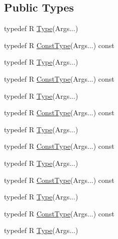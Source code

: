 \subsection*{Public Types}
\begin{DoxyCompactItemize}
\item 
typedef R \mbox{\hyperlink{structfakeit_1_1Prototype_3_01R_07Args_8_8_8_08_4_ab60f23ae5c02a3a715e1b7d959a1f502}{Type}}(Args...)
\item 
typedef R \mbox{\hyperlink{structfakeit_1_1Prototype_3_01R_07Args_8_8_8_08_4_ae3e717bc1f9c549d4517139ae932049e}{Const\+Type}}(Args...) const
\item 
typedef R \mbox{\hyperlink{structfakeit_1_1Prototype_3_01R_07Args_8_8_8_08_4_ab60f23ae5c02a3a715e1b7d959a1f502}{Type}}(Args...)
\item 
typedef R \mbox{\hyperlink{structfakeit_1_1Prototype_3_01R_07Args_8_8_8_08_4_ae3e717bc1f9c549d4517139ae932049e}{Const\+Type}}(Args...) const
\item 
typedef R \mbox{\hyperlink{structfakeit_1_1Prototype_3_01R_07Args_8_8_8_08_4_ab60f23ae5c02a3a715e1b7d959a1f502}{Type}}(Args...)
\item 
typedef R \mbox{\hyperlink{structfakeit_1_1Prototype_3_01R_07Args_8_8_8_08_4_ae3e717bc1f9c549d4517139ae932049e}{Const\+Type}}(Args...) const
\item 
typedef R \mbox{\hyperlink{structfakeit_1_1Prototype_3_01R_07Args_8_8_8_08_4_ab60f23ae5c02a3a715e1b7d959a1f502}{Type}}(Args...)
\item 
typedef R \mbox{\hyperlink{structfakeit_1_1Prototype_3_01R_07Args_8_8_8_08_4_ae3e717bc1f9c549d4517139ae932049e}{Const\+Type}}(Args...) const
\item 
typedef R \mbox{\hyperlink{structfakeit_1_1Prototype_3_01R_07Args_8_8_8_08_4_ab60f23ae5c02a3a715e1b7d959a1f502}{Type}}(Args...)
\item 
typedef R \mbox{\hyperlink{structfakeit_1_1Prototype_3_01R_07Args_8_8_8_08_4_ae3e717bc1f9c549d4517139ae932049e}{Const\+Type}}(Args...) const
\item 
typedef R \mbox{\hyperlink{structfakeit_1_1Prototype_3_01R_07Args_8_8_8_08_4_ab60f23ae5c02a3a715e1b7d959a1f502}{Type}}(Args...)
\item 
typedef R \mbox{\hyperlink{structfakeit_1_1Prototype_3_01R_07Args_8_8_8_08_4_ae3e717bc1f9c549d4517139ae932049e}{Const\+Type}}(Args...) const
\item 
typedef R \mbox{\hyperlink{structfakeit_1_1Prototype_3_01R_07Args_8_8_8_08_4_ab60f23ae5c02a3a715e1b7d959a1f502}{Type}}(Args...)

\end{DoxyCompactItemize}
